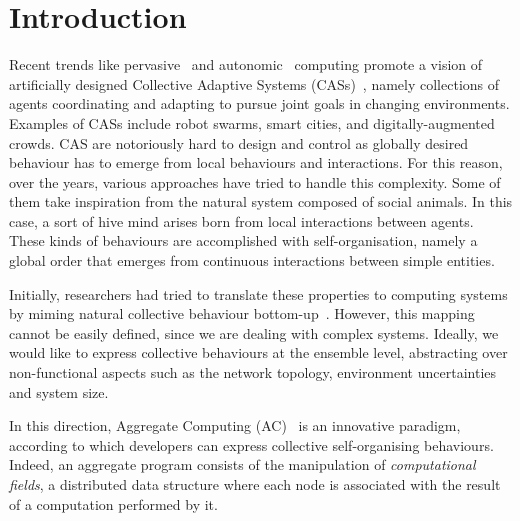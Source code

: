 \documentclass[conference]{IEEEtran}
\begin{document}
\section{Introduction}
Recent trends like pervasive~\cite{DBLP:journals/wc/Satyanarayanan01} and autonomic~\cite{DBLP:journals/computer/KephartC03} computing 
 promote a vision of artificially designed Collective Adaptive Systems (CASs)~\cite{DBLP:conf/huc/Ferscha15},
 namely collections of agents coordinating and adapting %
 to pursue joint goals in changing environments.
 Examples of CASs include robot swarms, smart cities, and digitally-augmented crowds.
%
%
CAS are notoriously hard to design and control 
 as globally desired behaviour
 has to emerge from local behaviours and interactions. 
For this reason, over the years, various approaches have tried to handle this complexity. Some of them take inspiration from the natural system composed of social animals. %
%
In this case, a sort of hive mind arises 
 born from local interactions between agents. 
%
These kinds of behaviours are accomplished with self-organisation, 
 namely a global order that emerges from continuous 
 interactions between simple entities.

Initially, researchers had tried to translate these properties to computing systems by miming natural collective behaviour bottom-up~\cite{DBLP:journals/connection/Webb02}. %
%
However, this mapping cannot be easily defined, since we are dealing with complex systems.
%
Ideally, we would like to express collective behaviours at the ensemble level,
 abstracting over non-functional aspects such as the network topology, environment uncertainties and 
 system size.

In this direction, Aggregate Computing (AC)~\cite{DBLP:journals/computer/BealPV15} is an innovative paradigm, according to which
 developers can express collective self-organising behaviours. %
%
Indeed, an aggregate program 
 consists of the manipulation of \textit{computational fields}, a distributed
 data structure where each node is associated with the result of a computation
 performed by it.
%
\end{document}
